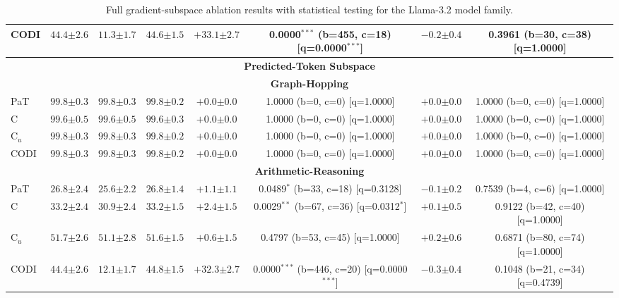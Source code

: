 \begin{table}[h!]
\begin{tabular}{l ccc cc cc}
CODI & $44.4 {\scriptstyle \pm 2.6}$ & $11.3 {\scriptstyle \pm 1.7}$ & $44.6 {\scriptstyle \pm 1.5}$ & $+33.1 {\scriptstyle \pm 2.7}$ & 0.0000$^{***}$ (b=455, c=18) [q=0.0000$^{***}$] & $-0.2 {\scriptstyle \pm 0.4}$ & 0.3961 (b=30, c=38) [q=1.0000] \\
\midrule
\multicolumn{8}{c}{\textbf{Predicted-Token Subspace}} \\
\midrule
\multicolumn{8}{c}{\textbf{Graph-Hopping}} \\
\midrule
PaT & $99.8 {\scriptstyle \pm 0.3}$ & $99.8 {\scriptstyle \pm 0.3}$ & $99.8 {\scriptstyle \pm 0.2}$ & $+0.0 {\scriptstyle \pm 0.0}$ & 1.0000 (b=0, c=0) [q=1.0000] & $+0.0 {\scriptstyle \pm 0.0}$ & 1.0000 (b=0, c=0) [q=1.0000] \\
C & $99.6 {\scriptstyle \pm 0.5}$ & $99.6 {\scriptstyle \pm 0.5}$ & $99.6 {\scriptstyle \pm 0.3}$ & $+0.0 {\scriptstyle \pm 0.0}$ & 1.0000 (b=0, c=0) [q=1.0000] & $+0.0 {\scriptstyle \pm 0.0}$ & 1.0000 (b=0, c=0) [q=1.0000] \\
C$_u$ & $99.8 {\scriptstyle \pm 0.3}$ & $99.8 {\scriptstyle \pm 0.3}$ & $99.8 {\scriptstyle \pm 0.2}$ & $+0.0 {\scriptstyle \pm 0.0}$ & 1.0000 (b=0, c=0) [q=1.0000] & $+0.0 {\scriptstyle \pm 0.0}$ & 1.0000 (b=0, c=0) [q=1.0000] \\
CODI & $99.8 {\scriptstyle \pm 0.3}$ & $99.8 {\scriptstyle \pm 0.3}$ & $99.8 {\scriptstyle \pm 0.2}$ & $+0.0 {\scriptstyle \pm 0.0}$ & 1.0000 (b=0, c=0) [q=1.0000] & $+0.0 {\scriptstyle \pm 0.0}$ & 1.0000 (b=0, c=0) [q=1.0000] \\
\midrule
\multicolumn{8}{c}{\textbf{Arithmetic-Reasoning}} \\
\midrule
PaT & $26.8 {\scriptstyle \pm 2.4}$ & $25.6 {\scriptstyle \pm 2.2}$ & $26.8 {\scriptstyle \pm 1.4}$ & $+1.1 {\scriptstyle \pm 1.1}$ & 0.0489$^{*}$ (b=33, c=18) [q=0.3128] & $-0.1 {\scriptstyle \pm 0.2}$ & 0.7539 (b=4, c=6) [q=1.0000] \\
C & $33.2 {\scriptstyle \pm 2.4}$ & $30.9 {\scriptstyle \pm 2.4}$ & $33.2 {\scriptstyle \pm 1.5}$ & $+2.4 {\scriptstyle \pm 1.5}$ & 0.0029$^{**}$ (b=67, c=36) [q=0.0312$^{*}$] & $+0.1 {\scriptstyle \pm 0.5}$ & 0.9122 (b=42, c=40) [q=1.0000] \\
C$_u$ & $51.7 {\scriptstyle \pm 2.6}$ & $51.1 {\scriptstyle \pm 2.8}$ & $51.6 {\scriptstyle \pm 1.5}$ & $+0.6 {\scriptstyle \pm 1.5}$ & 0.4797 (b=53, c=45) [q=1.0000] & $+0.2 {\scriptstyle \pm 0.6}$ & 0.6871 (b=80, c=74) [q=1.0000] \\
CODI & $44.4 {\scriptstyle \pm 2.6}$ & $12.1 {\scriptstyle \pm 1.7}$ & $44.8 {\scriptstyle \pm 1.5}$ & $+32.3 {\scriptstyle \pm 2.7}$ & 0.0000$^{***}$ (b=446, c=20) [q=0.0000$^{***}$] & $-0.3 {\scriptstyle \pm 0.4}$ & 0.1048 (b=21, c=34) [q=0.4739] \\
\bottomrule
\end{tabular}
\caption{Full gradient-subspace ablation results with statistical testing for the Llama-3.2 model family.}
\label{tab:gradsubspace_ablation_stats_llama}
\end{table}

